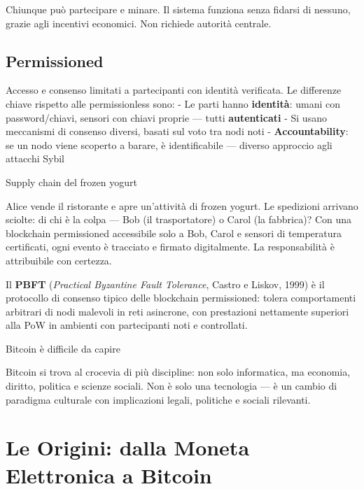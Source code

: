 \documentclass[
  italian,
  openany]{book}
\begin{document}
Chiunque può partecipare e minare. Il sistema funziona senza fidarsi di
nessuno, grazie agli incentivi economici. Non richiede autorità
centrale.

\subsection{Permissioned}\label{permissioned}

Accesso e consenso limitati a partecipanti con identità verificata. Le
differenze chiave rispetto alle permissionless sono: - Le parti hanno
\textbf{identità}: umani con password/chiavi, sensori con chiavi proprie
--- tutti \textbf{autenticati} - Si usano meccanismi di consenso
diversi, basati sul voto tra nodi noti - \textbf{Accountability}: se un
nodo viene scoperto a barare, è identificabile --- diverso approccio
agli attacchi Sybil

\begin{callouttip}{Supply chain del frozen yogurt}

Alice vende il ristorante e apre un'attività di frozen yogurt. Le
spedizioni arrivano sciolte: di chi è la colpa --- Bob (il
trasportatore) o Carol (la fabbrica)? Con una blockchain permissioned
accessibile solo a Bob, Carol e sensori di temperatura certificati, ogni
evento è tracciato e firmato digitalmente. La responsabilità è
attribuibile con certezza.

\end{callouttip}

Il \textbf{PBFT} (\emph{Practical Byzantine Fault Tolerance}, Castro e
Liskov, 1999) è il protocollo di consenso tipico delle blockchain
permissioned: tolera comportamenti arbitrari di nodi malevoli in reti
asincrone, con prestazioni nettamente superiori alla PoW in ambienti con
partecipanti noti e controllati.

\begin{calloutwarning}{Bitcoin è difficile da capire}

Bitcoin si trova al crocevia di più discipline: non solo informatica, ma
economia, diritto, politica e scienze sociali. Non è solo una tecnologia
--- è un cambio di paradigma culturale con implicazioni legali,
politiche e sociali rilevanti.

\end{calloutwarning}

\section{Le Origini: dalla Moneta Elettronica a
Bitcoin}\label{le-origini-dalla-moneta-elettronica-a-bitcoin}
\end{document}
